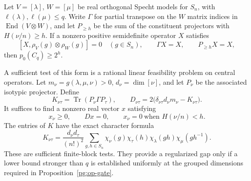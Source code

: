 \begin{proposition}
\label{pg:op-pt}
Let $V=[\lambda]$, $W=[\mu]$ be real orthogonal Specht models for $S_n$,
with $\ell(\lambda),\ell(\mu)\leq q$. Write $\Gamma$ for partial transpose
on the $W$ matrix indices in $\operatorname{End}(V\otimes W)$, and let
$P_{\geq h}$ be the sum of the constituent projectors with
$H(\nu/n)\geq h$. If a nonzero positive semidefinite operator $X$ satisfies
\[
 [X,\rho_V(g)\otimes\rho_W(g)]=0\quad(g\in S_n),\qquad
 \Gamma X=X,\qquad P_{\geq h}X=X,
 \tag{PG-OP-PT-test}
\]
then $p_0(C_q)\geq2^h$.

A sufficient test of this form is a rational linear feasibility problem on
central operators. Let $m_\nu=g(\lambda,\mu,\nu)>0$,
$d_\nu=\dim[\nu]$, and let $P_\nu$ be the associated isotypic projector.
Define
\[
 K_{\nu\tau}=\operatorname{Tr}(P_\nu\Gamma P_\tau),\qquad
 D_{\nu\tau}=2\bigl(\delta_{\nu\tau}d_\nu m_\nu-K_{\nu\tau}\bigr).
 \tag{PG-OP-PT-Gram}
\]
It suffices to find a nonzero real vector $x$ satisfying
\[
 x_\nu\geq0,\qquad Dx=0,\qquad
 x_\nu=0\ \text{when }H(\nu/n)<h.
 \tag{PG-OP-PT-linear}
\]
The entries of $K$ have the exact character formula
\[
 K_{\nu\tau}=
 \frac{d_\nu d_\tau}{(n!)^2}
 \sum_{g,h\in S_n}
 \chi_\nu(g)\chi_\tau(h)\chi_\lambda(gh)
 \chi_\mu(gh^{-1}).
 \tag{PG-OP-PT-character}
\]
These are sufficient finite-block tests. They provide a regularized gap
only if a lower bound stronger than $q$ is established uniformly at the
grouped dimensions required in Proposition~\ref{pg:op-gate}.
\end{proposition}
